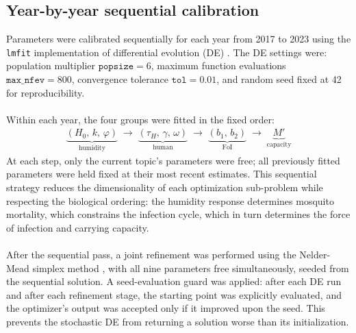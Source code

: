 \documentclass[a4paper,fleqn]{cas-dc}
\begin{document}
\subsection{Year-by-year sequential calibration}
\label{sec:year_by_year_calibration}

Parameters were calibrated sequentially for each year from 2017 to 2023 using the \texttt{lmfit} implementation of differential evolution (DE) \cite{storn_price_1997}. The DE settings were: population multiplier $\texttt{popsize} = 6$, maximum function evaluations $\texttt{max\_nfev} = 800$, convergence tolerance $\texttt{tol} = 0.01$, and random seed fixed at 42 for reproducibility.
\\\\
Within each year, the four groups were fitted in the fixed order:
\begin{align}
\underbrace{(H_0,\, k,\, \varphi)}_{\text{humidity}} \;\to\; \underbrace{(\tau_H,\, \gamma,\, \omega)}_{\text{human}} \;\to\; \underbrace{(b_1,\, b_2)}_{\text{FoI}} \;\to\; \underbrace{M'}_{\text{capacity}}
\label{eq:topic_order}
\end{align}
At each step, only the current topic's parameters were free; all previously fitted parameters were held fixed at their most recent estimates. This sequential strategy reduces the dimensionality of each optimization sub-problem while respecting the biological ordering: the humidity response determines mosquito mortality, which constrains the infection cycle, which in turn determines the force of infection and carrying capacity.
\\\\
After the sequential pass, a joint refinement was performed using the Nelder-Mead simplex method \cite{nelder_mead_1965}, with all nine parameters free simultaneously, seeded from the sequential solution. A seed-evaluation guard was applied: after each DE run and after each refinement stage, the starting point was explicitly evaluated, and the optimizer's output was accepted only if it improved upon the seed. This prevents the stochastic DE from returning a solution worse than its initialization.
\end{document}
